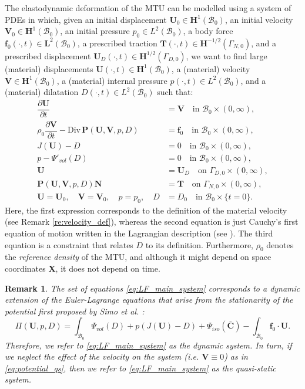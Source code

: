 \documentclass{sfuthesis}
\numberwithin{equation}{section}
\numberwithin{figure}{chapter}
\numberwithin{table}{chapter}
\newtheorem{remark}[theorem]{Remark}
\theoremstyle{definition}
\def\*#1{{\mathbf{#1}}} %
\newcommand{\pder}[2]{\dfrac{\partial #1}{\partial #2}}
\newcommand{\Divt}[1]{{\bm{\mathrm{Div}} \, #1}}
\newcommand{\B}{\mathcal{B}}
\begin{document}
The elastodynamic deformation of the MTU can be modelled using a system of PDEs in which, given an initial displacement $\*U_0 \in \*H^1(\B_0)$, an initial velocity $\*V_0 \in \*H^1(\B_0)$, an initial pressure $p_0 \in L^2(\B_0)$, a body force $\*f_0(\cdot, t) \in \*L^2(\B_0)$, a prescribed traction $\*T(\cdot,t) \in \*H^{-1/2}(\Gamma_{N,0})$, and a prescribed displacement $\*U_D(\cdot, t) \in \*H^{1/2}(\Gamma_{D,0})$, we want to find large (material) displacements $\*U(\cdot,t) \in \*H^1(\B_0)$, a (material) velocity $\*V \in \*H^1(\B_0)$, a (material) internal pressure $p(\cdot,t) \in L^2(\B_0)$, and a (material) dilatation $D(\cdot, t) \in L^2(\B_0)$ such that:
\begin{subequations} \label{eq:LF_main_system}
    \begin{align}
        \label{eq:LF_main_system_1}\pder{\*U}{t} &= \*V  \quad \text{in } \B_0 \times (0,\infty),\\
        \label{eq:LF_main_system_2}\rho_0 \pder{\*V}{t} - \Divt{\*P(\*U,\*V,p,D)} &= \*f_0 \quad \text{in } \B_0 \times (0,\infty), \\
        \label{eq:LF_main_system_3}J(\*U) - D &= 0 \quad \text{in } \B_0 \times (0,\infty), \\
        \label{eq:LF_main_system_4}p-\Psi'_{vol}(D) &= 0 \quad \text {in } \B_0 \times (0,\infty), \\
        \*U &= \*U_D \quad \text{on } \Gamma_{D,0} \times (0,\infty), \\
        \label{eq:bc_traction_0}\*P(\*U,\*V,p,D) \*N &= \*T \quad \text{on }\Gamma_{N,0} \times (0,\infty), \\
        \*U = \*U_0, \quad \*V=\*V_0, \quad p=p_0, \quad D &= D_0 \quad \text{in } \B_0 \times \{t=0\}.
    \end{align}
\end{subequations}
Here, the first expression corresponds to the definition of the material velocity (see Remark \ref{re:velocity_def}), whereas the second equation is just Cauchy's first equation of motion written in the Lagrangian description (see \cite[Section 4.3]{HolzapfelBook}). 
The third equation is a constraint that relates $D$ to its definition.
Furthermore, $\rho_0$ denotes the \textit{reference density} of the MTU, and although it might depend on space coordinates $\*X$, it does not depend on time.

\begin{remark} \label{re:quasi-static_dynamic}
    The set of equations \eqref{eq:LF_main_system} corresponds to a dynamic extension of the Euler-Lagrange equations that arise from the stationarity of the potential first proposed by Simo et al. \cite{SimoTaylorPister1985}:
    \begin{equation} \label{eq:potential_qs}
        \Pi(\*U,p,D) = \int_{\B_0} \Psi_{vol}(D) + p(J(\*U) - D) + \Psi_{iso}(\bar{\*C}) - \int_{\B_0} \*f_0 \cdot \*U.
    \end{equation}
    Therefore, we refer to \eqref{eq:LF_main_system} as the \textit{dynamic} system. In turn, if we neglect the effect of the velocity on the system (i.e. $\*V \equiv 0$) as in \eqref{eq:potential_qs}, then we refer to \eqref{eq:LF_main_system} as the \textit{quasi-static} system.    
\end{remark}
\end{document}
